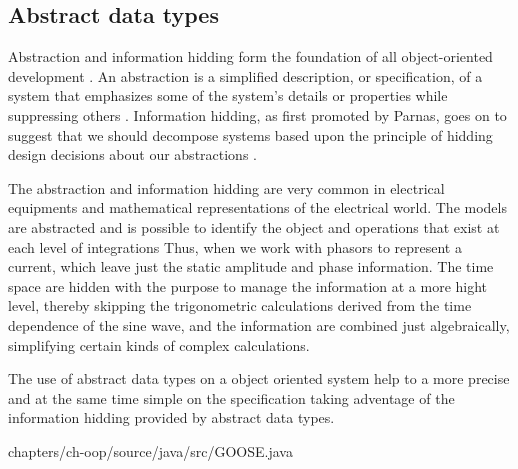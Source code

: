 \subsection{Abstract data types}

Abstraction and information hidding form 
the foundation of all object-oriented 
development \cite{Levy:1984}. 
An abstraction is a simplified description, 
or specification, of a system that emphasizes 
some of the system's details or properties while
suppressing others \cite{Shaw:1984}.
Information hidding, as first promoted by Parnas,
goes on to suggest that we should decompose 
systems based upon the principle of hidding 
design decisions about our 
abstractions \cite{Parnas:1979} \cite{Grady:1995}.

The abstraction and information hidding 
are very common in electrical equipments and 
mathematical representations of the 
electrical world. The 
models are abstracted 
and is possible to identify the object and 
operations that exist at each level of integrations 
Thus, 
when  we work 
with phasors to represent a current, which 
leave just the static amplitude and phase
information. The time space are hidden with 
the purpose to manage the information 
at a more hight level, 
thereby skipping the trigonometric calculations 
derived from the time dependence of the sine wave, 
and the information are combined just algebraically, 
simplifying certain kinds of complex 
calculations.  \cite{Grady:1995}


The use of abstract data types on a object oriented system 
help to a more precise and at the same time simple on the 
specification taking adventage of the information hidding 
provided by abstract 
data types. \cite{} 


		 {chapters/ch-oop/source/java/src/GOOSE.java}


